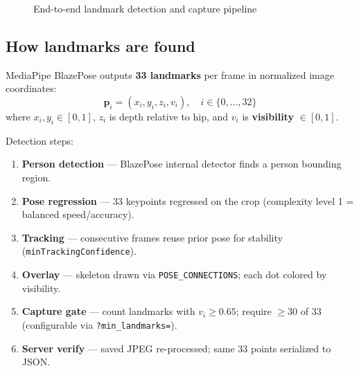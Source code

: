 \documentclass[a4paper,fleqn]{cas-sc}
\begin{document}
\begin{figure}[h]
\centering
{}
\caption{End-to-end landmark detection and capture pipeline}
\label{fig:pipeline}
\end{figure}

\subsection{How landmarks are found}

MediaPipe BlazePose outputs \textbf{33 landmarks} per frame in normalized image coordinates:
\begin{equation}
  \mathbf{p}_i = (x_i, y_i, z_i, v_i), \quad i \in \{0,\ldots,32\}
\end{equation}
where $x_i, y_i \in [0,1]$, $z_i$ is depth relative to hip, and $v_i$ is \textbf{visibility} $\in [0,1]$.

Detection steps:
\begin{enumerate}
  \item \textbf{Person detection} --- BlazePose internal detector finds a person bounding region.
  \item \textbf{Pose regression} --- 33 keypoints regressed on the crop (complexity level 1 = balanced speed/accuracy).
  \item \textbf{Tracking} --- consecutive frames reuse prior pose for stability (\texttt{minTrackingConfidence}).
  \item \textbf{Overlay} --- skeleton drawn via \texttt{POSE\_CONNECTIONS}; each dot colored by visibility.
  \item \textbf{Capture gate} --- count landmarks with $v_i \geq 0.65$; require $\geq 30$ of 33 (configurable via \texttt{?min\_landmarks=}).
  \item \textbf{Server verify} --- saved JPEG re-processed; same 33 points serialized to JSON.
\end{enumerate}
\end{document}
